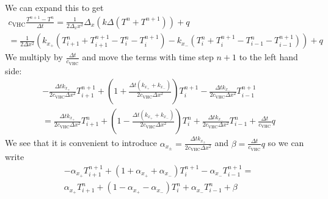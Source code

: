 \documentclass{scrartcl}
\newcommand{\VHC}{c_\mathrm{VHC}}
\begin{document}
We can expand this to get
\begin{multline}
\VHC \frac{T^{n+1}-T^n}{\Delta t} = \frac 1 {2\Delta_x x^2} \Delta_x \left( k \Delta \left(T^n + T^{n+1} \right) \right) + q\\
= \frac 1 {2\Delta x^2} \left( k_{x_+} \left(T_{i+1}^n + T_{i+1}^{n+1} - T_i^n - T_i^{n+1}\right) - k_{x_-} \left(T_i^n + T_i^{n+1} - T_{i-1}^n - T_{i-1}^{n+1}\right)\right) + q
\end{multline}
We multiply by $\frac{\Delta t}{\VHC}$ and move the terms with time step $n+1$ to the left hand side:
\begin{equation}
\begin{split}
- \frac{\Delta t k_{x_+}}{2\VHC\Delta x^2} T_{i+1}^{n+1} + \left( 1 + \frac{\Delta t (k_{x_+}+k_{x_-})}{2\VHC\Delta x^2} \right) T_i^{n+1} - \frac{\Delta t k_{x_-}}{2\VHC\Delta x^2} T_{i-1}^{n+1}\\
= \frac{\Delta t k_{x_+}}{2\VHC\Delta x^2} T_{i+1}^n + \left( 1 - \frac{\Delta t (k_{x_+} + k_{x_-})}{2\VHC\Delta x^2} \right) T_i^n + \frac{\Delta t k_{x_-}}{2\VHC\Delta x^2} T_{i-1}^n + \frac{\Delta t}{\VHC} q
\end{split}
\end{equation}
We see that it is convenient to introduce $\alpha_{x_\pm} = \frac{\Delta t k_{x_\pm}}{2\VHC\Delta x^2}$ and $\beta = \frac{\Delta t}{\VHC} q$ so we can write
\begin{equation}
\begin{split}
-\alpha_{x_+} T_{i+1}^{n+1} + \left( 1 + \alpha_{x_+} + \alpha_{x_-} \right) T_i^{n+1} - \alpha_{x_-} T_{i-1}^{n+1} =\\ \alpha_{x_+} T_{i+1}^n + \left( 1 - \alpha_{x_+} - \alpha_{x_-} \right) T_i^n + \alpha_{x_-} T_{i-1}^n + \beta
\end{split}
\end{equation}
\end{document}
